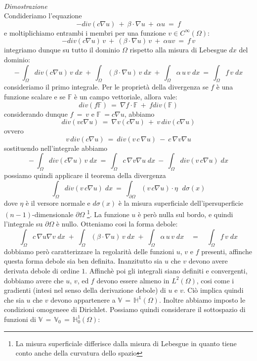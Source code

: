 \documentclass[12pt,a4paper]{report}
\theoremstyle{theorem}
\theoremstyle{definition}
\begin{document}
\hfill \\
\emph{Dimostrazione}\\
Condideriamo l'equazione
\[ -div(c\nabla{u}) \ + \ \beta \cdot \nabla{u} \ + \ \alpha u \ = \ f \]
e moltiplichiamo entrambi i membri per una funzione $v \in C^{\infty}(\Omega)$:
\[ -div(c\nabla{u}) \, v \ + \ (\beta \cdot \nabla{u}) \, v \ + \ \alpha u v \ = \ f \, v\]
integriamo dunque su tutto il dominio $\Omega$ rispetto alla misura di Lebesgue $dx$ del dominio:
\[ - \ \int_{\Omega}{div(c\nabla{u}) \, v \; dx} \ + \ \int_{\Omega}{(\beta \cdot \nabla{u}) \, v \; dx} \ + \ \int_{\Omega}{\alpha \, u \, v \; dx} \ = \ \int_{\Omega}{f  \, v \; dx}\]
consideriamo il primo integrale. Per le proprietà della divergenza se $f$ è una funzione scalare e se $\mathbb{F}$ è un campo vettoriale, allora vale:
\[ div(f \mathbb{F}) \ = \  \nabla f \cdot \mathbb{F} \ + \ f div(\mathbb{F})\]
considerando dunque $f \ = \ v$ e $\mathbb{F} \ = c \nabla u$, abbiamo
\[ div(v c \nabla u) \ = \  \nabla v (c \nabla u) \ + \ v \, div(c \nabla u)\]
ovvero
\[ v \, div(c \nabla u) \ = \ div(v \, c \, \nabla u) \ - \ c \, \nabla v \nabla u \]
sostituendo nell'integrale abbiamo
\[ - \ \int_{\Omega}{div(c\nabla{u}) \, v \; dx} \ = \ \int_{\Omega}{c \, \nabla v \nabla u \; dx} \ - \ \int_{\Omega}{div(v \, c \nabla u) \; dx}\]
possiamo quindi applicare il teorema della divergenza
\[ \int_{\Omega}{div(v \, c \nabla u) \; dx} \ = \ \int_{\partial \Omega}{ (v \, c \nabla u) \cdot \eta \, \, \; d \sigma (x)}\]
dove $\eta$ è il versore normale e $d \sigma (x) $ è la misura superficiale dell'ipersuperficie $(n-1)$-dimensionale $\partial \Omega $ \footnote{La misura superficiale differisce dalla misura di Lebesgue in quanto tiene conto anche della curvatura dello spazio}. La funzione $u$ è però nulla sul bordo, e quindi l'integrale su $\partial \Omega$ è nullo. Otteniamo cosi la forma debole:
\[ \int_{\Omega}{c \, \nabla u \nabla v \; dx} \; + \; \int_{\Omega}{(\beta \cdot \nabla u) \, v \; dx} \; + \; \int_{\Omega}{\alpha \, u \, v \; dx} \quad = \quad \int_{\Omega}{f \, v \; dx} \]
dobbiamo però caratterizzare la regolarità delle funzioni $u$, $v$ e $f$ presenti, affinche questa forma debole sia ben definita.
Inanzitutto sia $u$ che $v$ devono avere derivata debole di ordine $1$. Affinchè poi gli integrali siano definiti e convergenti, dobbiamo avere che $u$, $v$, ed $f$ devono essere almeno in $L^{2}(\Omega)$, cosi come i gradienti (intesi nel senso della derivazione debole) di $u$ e $v$. Ciò implica quindi che sia $u$ che $v$ devono appartenere a $ \mathbb{V} \, = \, \mathbb{H^1}(\Omega)$. Inoltre abbiamo imposto le condizioni omogeneee di Dirichlet. Possiamo quindi considerare il sottospazio di funzioni di $ \mathbb{V} \, = \, \mathbb{V}_{0} \, = \,\mathbb{H}_{0}^{1}(\Omega)$:  \label{Spazio H01}
\end{document}
